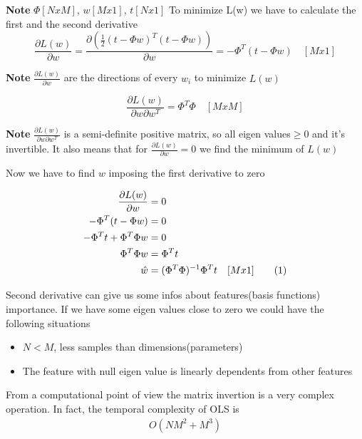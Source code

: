 \documentclass[main.tex]{subfiles}
\newcommand\numberthis{\addtocounter{equation}{1}\tag{\theequation}}
\begin{document}
\textbf{Note} $\Phi[NxM]$, $w[Mx1]$, $t[Nx1]$
\newline
To minimize L(w) we have to calculate the first and the second derivative
\begin{equation}
    \frac{\partial L(w)}{\partial w}=\frac{\partial(\frac{1}{2}(t-\Phi w)^T(t-\Phi w))}{\partial w} = -\Phi^T(t-\Phi w) \quad[Mx1]
\end{equation}

\textbf{Note} $\frac{\partial L(w)}{\partial w}$ are the directions of every $w_i$ to minimize $L(w)$

\begin{equation}
    \frac{\partial L(w)}{\partial w \partial w^T}=\Phi^T\Phi \quad [MxM]
\end{equation}

\textbf{Note} $\frac{\partial L(w)}{\partial w \partial w^T}$ is a semi-definite positive matrix\footnotemark, so all eigen values$\geq0$ and it's invertible. It also means that for $\frac{\partial L(w)}{\partial w}=0$ we find the minimum of $L(w)$


Now we have to find $w$ imposing the first derivative to zero

\begin{align*}
    \frac{\partial L(w)}{\partial w}&=0\\
    -\Phi^T(t-\Phi w)&=0\\
    -\Phi^Tt+\Phi^T\Phi w &=0\\
    \Phi^T\Phi w&=\Phi^Tt\\
    \hat{w}&=(\Phi^T\Phi)^{-1}\Phi^Tt \quad [Mx1] \numberthis
\end{align*}

Second derivative can give us some infos about features(basis functions) importance. If we have some eigen values close to zero we could have the following situations
\begin{itemize}
    \item $N<M$, less samples than dimensions(parameters)
    \item The feature with null eigen value is linearly dependents from other features
\end{itemize}
From a computational point of view the matrix invertion is a very complex operation. In fact, the temporal complexity of OLS is
\begin{align*}
    O(NM^2+M^3)
\end{align*}
\end{document}
